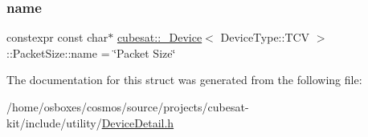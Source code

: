 \subsubsection{\texorpdfstring{name}{name}}
{\footnotesize\ttfamily constexpr const char$\ast$ \hyperlink{structcubesat_1_1__Device}{cubesat\+::\+\_\+\+Device}$<$ Device\+Type\+::\+T\+CV $>$\+::Packet\+Size\+::name = \char`\"{}Packet Size\char`\"{}\hspace{0.3cm}{\ttfamily [static]}}



The documentation for this struct was generated from the following file\+:\begin{DoxyCompactItemize}
\item 
/home/osboxes/cosmos/source/projects/cubesat-\/kit/include/utility/\hyperlink{DeviceDetail_8h}{Device\+Detail.\+h}\end{DoxyCompactItemize}
